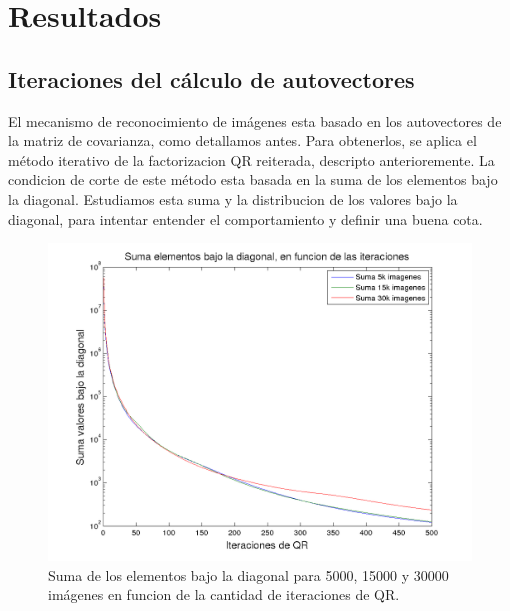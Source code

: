 \section{Resultados}

\subsection{Iteraciones del c\'alculo de autovectores}
El mecanismo de reconocimiento de im\'agenes esta basado en los autovectores
de la matriz de covarianza, como detallamos antes. Para obtenerlos, se aplica
el m\'etodo iterativo de la factorizacion QR reiterada, descripto anterioremente.
La condicion de corte de este m\'etodo esta basada en la suma de los elementos bajo
la diagonal. Estudiamos esta suma y la distribucion de los valores bajo la diagonal,
para intentar entender el comportamiento y definir una buena cota. 

\def \hrwidth {500pt}

\begin{figure}[H]
\begin {center}
\includegraphics[width=\hrwidth]{plots/SUM.png}
\end {center}
\caption{Suma de los elementos bajo la diagonal para 5000, 15000 y 30000 im\'agenes
en funcion de la cantidad de iteraciones de QR.}
\label{fig:SUM}
\end{figure}

